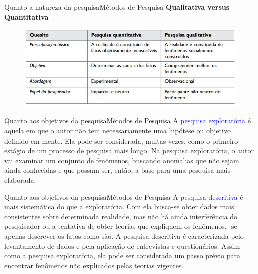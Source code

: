 \documentclass[t]{beamer}
\begin{document}
\begin{ftst}{Quanto a natureza da pesquisa}{Métodos de Pesquisa}
\vone
\justifying
\textbf{Qualitativa versus Quantitativa}
\vone
\begin{figure}
    \centering
    \includegraphics[scale=0.6]{Figuras/02_natureza_pesquisa.jpg}
    \label{fig:natureza_pesquisa}
\end{figure}

\end{ftst}


\begin{ftst}{Quanto aos objetivos da pesquisa}{Métodos de Pesquisa}
\vone
\justifying
A \textcolor{blue}{pesquisa exploratória} é aquela em que o autor não tem necessariamente uma hipótese ou objetivo definido em mente. 
\vone
Ela pode ser considerada, muitas vezes, como o primeiro estágio de um processo de pesquisa mais longo. 
\vone
Na pesquisa exploratória, o autor vai examinar um conjunto de fenômenos, buscando anomalias que não sejam ainda conhecidas e que possam ser, então, a base para uma pesquisa mais elaborada.
\vone


\end{ftst}


\begin{ftst}{Quanto aos objetivos da pesquisa}{Métodos de Pesquisa}
\vone
\justifying
A \textcolor{blue}{pesquisa descritiva} é mais sistemática do que a exploratória. Com ela busca-se obter dados mais consistentes sobre determinada realidade, mas não há ainda interferência do pesquisador ou a tentativa de obter teorias que expliquem os fenômenos. 
\voneTenta-se
apenas descrever os fatos como são.
\vone
A pesquisa descritiva é caracterizada pelo levantamento de dados e pela aplicação de entrevistas e questionários. 
\vone
Assim como a pesquisa exploratória, ela pode ser considerada um passo prévio para encontrar fenômenos não explicados pelas teorias vigentes.

\end{ftst}
\end{document}
